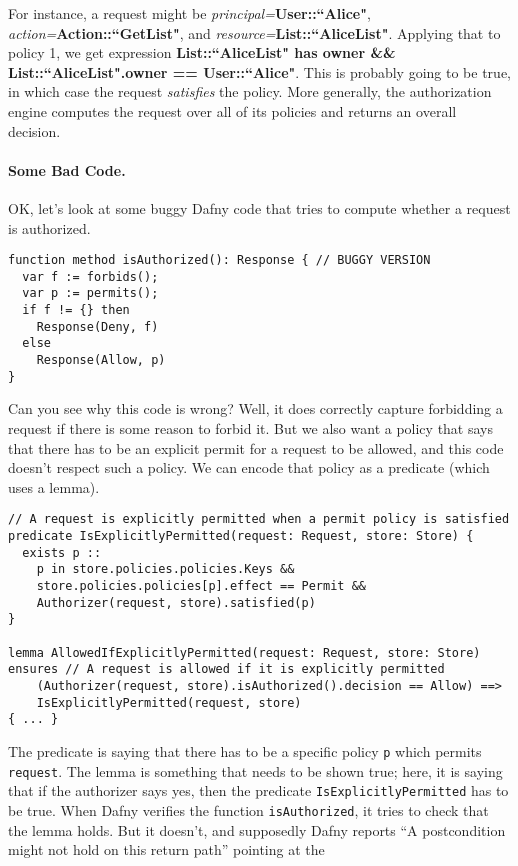 \documentclass[11pt]{article}
\begin{document}
For instance, a request might be \textit{principal=}\textbf{User::``Alice"}, \textit{action=}\textbf{Action::``GetList"}, and \textit{resource=}\textbf{List::``AliceList"}. Applying that to policy 1, we get expression \textbf{List::``AliceList" has owner \&\& List::``AliceList".owner == User::``Alice"}. This is probably going to be true, in which case the request \emph{satisfies} the policy. More generally, the authorization engine computes the request over all of its policies and returns an overall decision.

\paragraph{Some Bad Code.} OK, let's look at some buggy Dafny code that tries to compute whether a request is authorized.
\begin{lstlisting}[language=dafny]
function method isAuthorized(): Response { // BUGGY VERSION
  var f := forbids();
  var p := permits();
  if f != {} then
    Response(Deny, f)
  else
    Response(Allow, p)
}
\end{lstlisting}
Can you see why this code is wrong? Well, it does correctly capture forbidding a request if there is some reason to forbid it. But we also want a policy that says that there has to be an explicit permit for a request to be allowed, and this code doesn't respect such a policy. We can encode that policy as a predicate (which uses a lemma).
\begin{lstlisting}[language=dafny]
// A request is explicitly permitted when a permit policy is satisfied
predicate IsExplicitlyPermitted(request: Request, store: Store) {
  exists p ::
    p in store.policies.policies.Keys &&
    store.policies.policies[p].effect == Permit &&
    Authorizer(request, store).satisfied(p)
}

lemma AllowedIfExplicitlyPermitted(request: Request, store: Store)
ensures // A request is allowed if it is explicitly permitted
	(Authorizer(request, store).isAuthorized().decision == Allow) ==>
	IsExplicitlyPermitted(request, store)
{ ... }
\end{lstlisting}
The predicate is saying that there has to be a specific policy \texttt{p} which permits \texttt{request}.
The lemma is something that needs to be shown true; here, it is saying that if the authorizer says yes,
then the predicate \texttt{IsExplicitlyPermitted} has to be true. When Dafny verifies the
function \texttt{isAuthorized}, it tries to check that the lemma holds. But it doesn't, and
supposedly Dafny reports ``A postcondition might not hold on this return path'' pointing at the
\end{document}
